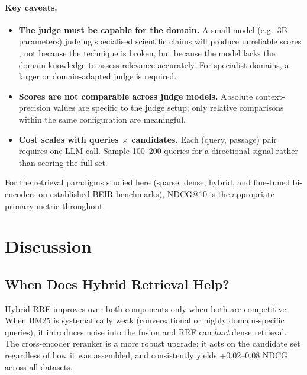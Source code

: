 \documentclass[12pt, a4paper]{article}
\begin{document}
\paragraph{Key caveats.}
\begin{itemize}
  \item \textbf{The judge must be capable for the domain.}  A small model
        (e.g.\ 3B parameters) judging specialised scientific claims will
        produce unreliable scores , not because the technique is broken, but because the model lacks the domain knowledge to assess relevance
        accurately.  For specialist domains, a larger or domain-adapted judge
        is required.
  \item \textbf{Scores are not comparable across judge models.}  Absolute
        context-precision values are specific to the judge setup; only
        relative comparisons within the same configuration are meaningful.
  \item \textbf{Cost scales with queries $\times$ candidates.}  Each
        (query, passage) pair requires one LLM call.  Sample 100--200
        queries for a directional signal rather than scoring the full set.
\end{itemize}

For the retrieval paradigms studied here (sparse, dense, hybrid, and
fine-tuned bi-encoders on established BEIR benchmarks), NDCG@10 is
the appropriate primary metric throughout.

\section{Discussion}
\label{sec:discussion}

\subsection{When Does Hybrid Retrieval Help?}

Hybrid RRF improves over both components only when both are competitive.
When BM25 is systematically weak (conversational or highly domain-specific
queries), it introduces noise into the fusion and RRF can \emph{hurt} dense
retrieval.  The cross-encoder reranker is a more robust upgrade: it acts on
the candidate set regardless of how it was assembled, and consistently yields
+0.02--0.08 NDCG across all datasets.
\end{document}
